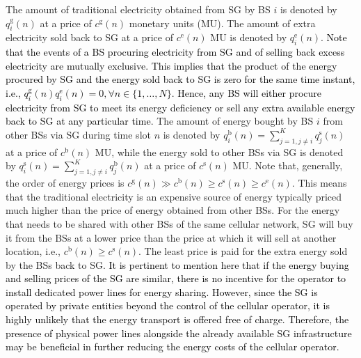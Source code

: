 \documentclass[10pt, letter,twocolumn]{IEEEtran}
\begin{document}
The amount of traditional electricity obtained from SG by BS $i$ is denoted by $q_{i}^{\text{g}}(n)$ at a price of $c^{\text{g}}(n)$ monetary units (MU). The amount of extra electricity sold back to SG at a price of $c^{\text{e}}(n)$ MU is denoted by $q_{i}^{\text{e}}(n)$. \textcolor{black}{Note that the events of a BS procuring electricity from SG and of selling back excess electricity are mutually exclusive. This implies that the product of the energy procured by SG and the energy sold back to SG is zero for the same time instant, i.e., $q_{i}^{\text{g}}(n) q_{i}^{\text{e}}(n) = 0, \forall n \in \{1,\ldots,N\}$. Hence, any BS will either procure electricity from SG to meet its energy deficiency or sell any extra available energy back to SG at any particular time.} The amount of energy bought by BS $i$ from other BSs via SG during time slot $n$ is denoted by $q_{i}^{\text{b}}(n) =  \sum_{j=1, j \neq i}^{K} q_{j}^{\text{s}}(n)$ at a price of $c^{\text{b}}(n)$ MU, while the energy sold to other BSs via SG is denoted by $q_{i}^{\text{s}}(n) =  \sum_{j=1, j \neq i}^{K} q_{j}^{\text{b}}(n)$ at a price of $c^{\text{s}}(n)$ MU. Note that, generally, the order of energy prices is $c^{\text{g}}(n) \gg  c^{\text{b}}(n) \geq c^{\text{s}}(n) \geq c^{\text{e}}(n)$. This means that the traditional electricity is an expensive source of energy typically priced much higher than the price of energy obtained from other BSs. For the energy that needs to be shared with other BSs of the same cellular network, SG will buy it from the BSs at a lower price than the price at which it will sell at another location, i.e., $c^{\text{b}}(n) \geq c^{\text{s}}(n)$. The least price is paid for the extra energy sold by the BSs back to SG. \textcolor{black}{It is pertinent to mention here that if the energy buying and selling prices of the SG are similar, there is no incentive for the operator to install dedicated power lines for energy sharing. However, since the SG is operated by private entities beyond the control of the cellular operator, it is highly unlikely that the energy transport is offered free of charge. Therefore, the presence of physical power lines alongside the already available SG infrastructure may be beneficial in further reducing the energy costs of the cellular operator.}
\end{document}
